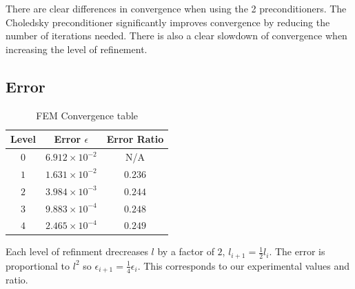 \documentclass[a4paper, 11pt]{article}
\begin{document}
				There are clear differences in convergence when using the 2 preconditioners.
				The Choledsky preconditioner significantly improves convergence by reducing the number of iterations needed.
				There is also a clear slowdown of convergence when increasing the level of refinement.
			
			\subsection{Error}
				\begin{table}[H]
					\centering
					\begin{tabular}{c|c|c}         
						\textbf{Level} 	& \textbf{ Error $ \epsilon $} 		& \textbf{Error Ratio}  \\ \hline
						$ 0  $			& $ 6.912 \times 10^{-2} $ 	& N/A \\ \hline
						$ 1  $			& $ 1.631 \times 10^{-2} $ 	& $ 0.236 $ \\ \hline
						$ 2  $			& $ 3.984 \times 10^{-3} $ 	& $ 0.244 $ \\ \hline
						$ 3  $			& $ 9.883 \times 10^{-4} $	& $ 0.248 $ \\ \hline
						$ 4  $			& $ 2.465 \times 10^{-4} $ 	& $ 0.249 $ \\ 
					\end{tabular}
					\caption{FEM Convergence table}
					\label{table:errors}
				\end{table}
				Each level of refinment drecreases $ l $ by a factor of $ 2 $, $ l_{i+1} = \frac{1}{2}l_i $.
				The error is proportional to $l^2$ so $ \epsilon_{i+1} = \frac{1}{4}\epsilon_i $.
				This corresponds to our experimental values and ratio.
	
	
\end{document}
